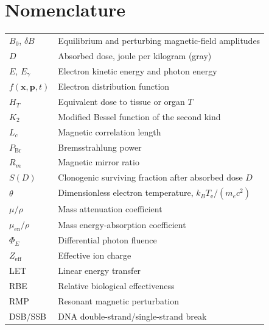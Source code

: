 \documentclass[12pt,oneside]{report}
\newcommand{\Te}{T_{\mathrm e}}
\newcommand{\Egamma}{E_{\gamma}}
\newcommand{\Zeff}{Z_{\mathrm{eff}}}
\theoremstyle{definition}
\begin{document}
\chapter*{Nomenclature}
\begin{longtable}{p{}p{}}
$B_0$, $\delta B$ & Equilibrium and perturbing magnetic-field amplitudes \\
$D$ & Absorbed dose, joule per kilogram (gray) \\
$E$, $\Egamma$ & Electron kinetic energy and photon energy \\
$f(\mathbf{x},\mathbf{p},t)$ & Electron distribution function \\
$H_T$ & Equivalent dose to tissue or organ $T$ \\
$K_2$ & Modified Bessel function of the second kind \\
$L_c$ & Magnetic correlation length \\
$P_{\mathrm{Br}}$ & Bremsstrahlung power \\
$R_m$ & Magnetic mirror ratio \\
$S(D)$ & Clonogenic surviving fraction after absorbed dose $D$ \\
$\theta$ & Dimensionless electron temperature, $k_B\Te/(m_ec^2)$ \\
$\mu/\rho$ & Mass attenuation coefficient \\
$\mu_{\mathrm{en}}/\rho$ & Mass energy-absorption coefficient \\
$\Phi_E$ & Differential photon fluence \\
$\Zeff$ & Effective ion charge \\
LET & Linear energy transfer \\
RBE & Relative biological effectiveness \\
RMP & Resonant magnetic perturbation \\
DSB/SSB & DNA double-strand/single-strand break \\
\end{longtable}
\clearpage













\end{document}
